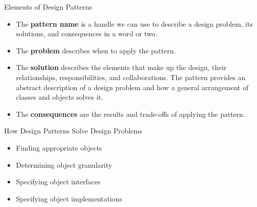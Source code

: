 \documentclass{beamer}
\begin{document}
\begin{frame}[fragile]{Elements of Design Patterns}


\begin{itemize}
\item The {\bf pattern name} is a handle we can use to describe a design problem, its solutions, and consequences in a word or two.
\item The {\bf problem} describes when to apply the pattern.
\item The {\bf solution} describes the elements that make up the design, their relationships, responsibilities, and collaborations.  The pattern provides an abstract description of a design problem and how a general arrangement of classes and objects solves it.
\item The {\bf consequences} are the results and trade-offs of applying the pattern.
\end{itemize}


\end{frame}

\begin{frame}[fragile]{How Design Patterns Solve Design Problems}


\begin{itemize}
\item Finding appropriate objects
\item Determining object granularity
\item Specifying object interfaces
\item Specifying object implementations
\end{itemize}


\end{frame}
\end{document}
